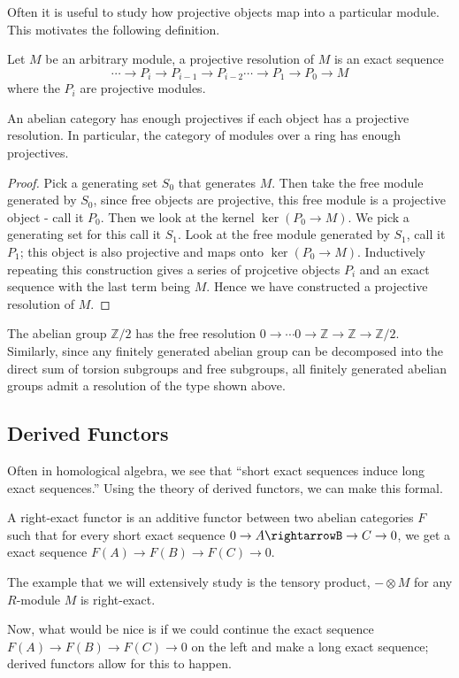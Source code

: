 Often it is useful to study how projective objects map into a particular module.
This motivates the following definition.
\begin{definition} Let $M$ be an arbitrary module, a projective resolution of
$M$ is an exact sequence
\begin{equation} \cdots\rightarrow P_i\rightarrow P_{i-1}\rightarrow
P_{i-2}\cdots\rightarrow P_1\rightarrow P_0\rightarrow M \end{equation} where
the $P_i$ are projective modules. \end{definition}
\begin{theorem}An abelian category has enough projectives if each object has a
projective resolution. In particular, the category of modules over a ring has
enough projectives. \end{theorem}
\begin{proof} Pick a generating set $S_0$ that generates $M$. Then take the free
module generated by $S_0$, since free objects are projective, this free module
is a projective object - call it $P_0$. Then we look at the kernel
$\ker(P_0\rightarrow M)$. We pick a generating set for this call it $S_1$. Look
at the free module generated by $S_1$, call it $P_1$; this object is also
projective and maps onto $\ker(P_0\rightarrow M)$. Inductively repeating this
construction gives a series of projcetive objects $P_i$ and an exact sequence
with the last term being $M$. Hence we have constructed a projective resolution
of $M$. \end{proof}
\begin{example} The abelian group $\mathbb{Z}/2$ has the free resolution $0\rightarrow\cdots 0\rightarrow\mathbb{Z}\rightarrow\mathbb{Z}\rightarrow\mathbb{Z}/2$.
Similarly, since any finitely generated abelian group can be decomposed into the direct sum of torsion subgroups and free subgroups, all finitely generated abelian groups admit a resolution of the type shown above.\end{example}

\subsection{Derived Functors}
Often in homological algebra, we see that ``short exact sequences induce long exact sequences.'' Using the theory of derived functors, we can make this formal.
\begin{definition} A right-exact functor is an additive functor between two abelian categories $F$ such that for every short exact sequence $0\rightarrow A\rightarrowB\rightarrow C\rightarrow 0$, we get a exact sequence $F(A)\rightarrow F(B)\rightarrow F(C)\rightarrow 0$. \end{definition}
\begin{example} The example that we will extensively study is the tensory product, $-\otimes M$ for any $R$-module $M$ is right-exact.\end{example}
Now, what would be nice is if we could continue the exact sequence $F(A)\rightarrow F(B)\rightarrow F(C)\rightarrow 0$ on the left and make a long exact sequence; derived functors allow for this to happen.

